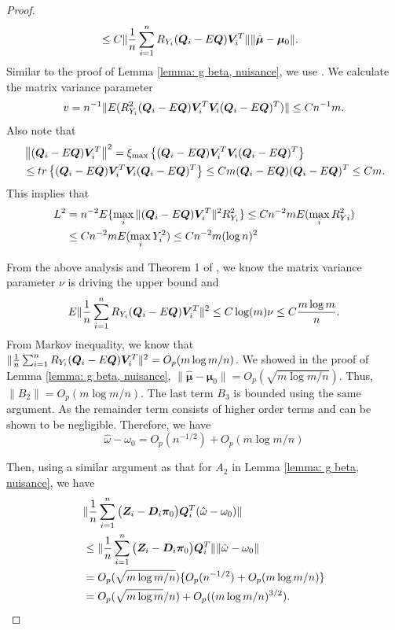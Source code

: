 \documentclass[12pt]{article}
\begin{document}
{{\begin{proof}
\begin{align*}
	& \leq C \| \frac1n \sum_{i=1}^n R_{Y_i} (\bm Q_i - E \bm Q) \bm{V}_i^T \| \|\hat{\bm\mu}- \bm\mu_0 \| .
\end{align*} 
Similar to the proof of Lemma \ref{lemma: g beta, nuisance}, we use  \citet[Theorem 1]{tropp2015expected}. We calculate the matrix variance parameter 
\begin{align*}
	v= n^{-1} \| E (  R_{Y_i}^2 (\bm Q_i - E \bm Q) \bm{V}_i^T  \bm{V}_i  (\bm Q_i - E \bm Q) ^T ) \| \leq Cn^{-1} m .
\end{align*}
Also note that 
\begin{align*}
	& \left\|  (\bm Q_i - E \bm Q) \bm{V}_i^T  \right\|^2  = \xi_{\max} \left\{  (\bm Q_i - E \bm Q) \bm{V}_i^T   \bm{V}_i (\bm Q_i - E \bm Q)^T \right\}\\
	&\leq tr \left\{ (\bm Q_i - E \bm Q) \bm{V}_i^T   \bm{V}_i (\bm Q_i - E \bm Q)^T \right\}  \leq Cm (\bm Q_i - E \bm Q)  (\bm Q_i - E \bm Q)^T \leq  Cm .
\end{align*}
This implies that 
\begin{align*}
	L^2 & = n^{-2} E \{ \max_i \|   (\bm Q_i - E \bm Q) \bm{V}_i^T \|^2 R_{Y_i}^2\} \leq C n^{-2}  m E (\max_i R_{Yi}^2 ) \\
	&\leq C  n^{-2}  m  E (\max_i Y_i^2 ) \leq C  n^{-2}  m (\log n )^2
\end{align*}

From the above analysis and Theorem 1 of \cite{tropp2015expected}, we know the matrix variance parameter $\nu$ is driving the upper bound and 
\begin{align*}
	E \| \frac1n \sum_{i=1}^n R_{Y_i} (\bm Q_i - E \bm Q) \bm{V}_i^T \|^2 \leq  C \log (m) \nu \leq C  \frac{m \log m}{n}. 
\end{align*}
From Markov inequality, we know that $ \| \frac1n \sum_{i=1}^n R_{Y_i} (\bm Q_i - E \bm Q) \bm{V}_i^T \|^2 = O_p( m\log m/n)$. We showed in the proof of Lemma \ref{lemma: g beta, nuisance}, $ \|\hat{\bm\mu}- \bm\mu_0 \|= O_p(\sqrt{m\log m /n})$. Thus, $\|B_2\| = O_p( m\log m/n)$.  The last term $B_3$ is bounded using the same argument. As the remainder term consists of higher order terms and can be shown to be negligible.  Therefore, we have  
 \[
 	\hat \omega - \omega_0 = O_p(n^{-1/2}) + O_p( m\log m/n)
 \]

Then, using a similar argument as that for $A_2$ in  Lemma \ref{lemma: g beta, nuisance}, we have 
\begin{align*}
 & \|	\frac{1}{n} \sum_{i=1}^{n}    \big( \bm{Z}_i-\bm D_i \bm\pi_0 \big)    \bm Q_i^T (\hat\omega - \omega_0)  \|\\
 &\leq  \| 	\frac{1}{n} \sum_{i=1}^{n}    \big( \bm{Z}_i-\bm D_i \bm\pi_0 \big)    \bm Q_i^T \| \|\hat\omega - \omega_0 \| \\
 &= O_p(\sqrt{m \log m /n})  \{ O_p(n^{-1/2}) + O_p( m\log m/n) \} \\
 &= O_p (\sqrt{m\log m }/n ) + O_p ((m\log m/n)^{3/2}).  
\end{align*}                                                                                                    


\end{proof}}}
\end{document}
